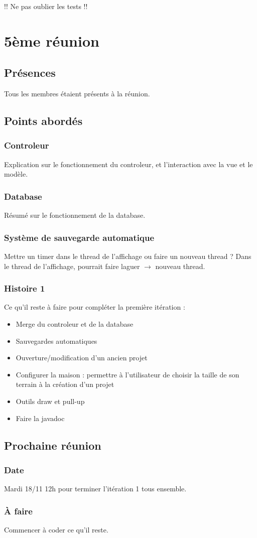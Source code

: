 \documentclass[12pt,a4paper]{article}
\begin{document}
			 !! Ne pas oublier les tests !!

\newpage
\section{5ème réunion}
	\subsection{Présences}
		Tous les membres étaient présents à la réunion.
	\subsection{Points abordés}
		\subsubsection{Controleur}
			Explication sur le fonctionnement du controleur, et l'interaction avec la vue et le modèle.
		\subsubsection{Database}
			Résumé sur le fonctionnement de la database.
		\subsubsection{Système de sauvegarde automatique}
			Mettre un timer dans le thread de l'affichage ou faire un nouveau thread ? Dans le thread de l'affichage, pourrait faire laguer $\rightarrow$ nouveau thread.
		\subsubsection{Histoire 1}
			Ce qu'il reste à faire pour compléter la première itération :
			\begin{itemize}
				\item Merge du controleur et de la database
				\item Sauvegardes automatiques
				\item Ouverture/modification d'un ancien projet
				\item Configurer la maison : permettre à l'utilisateur de choisir la taille de son terrain à la création d'un projet
				\item Outils draw et pull-up
				\item Faire la javadoc
			\end{itemize}
			
	\subsection{Prochaine réunion}
		\subsubsection{Date}
			Mardi 18/11 12h pour terminer l'itération 1 tous ensemble.
			
		\subsubsection{À faire}
			Commencer à coder ce qu'il reste.
\end{document}
